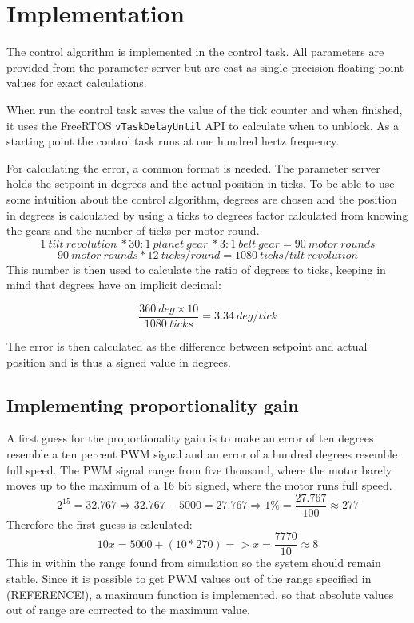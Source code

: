 \section{Implementation}
The control algorithm is implemented in the control task. All parameters are provided from the parameter server but are cast as single precision floating point values for exact calculations.

When run the control task saves the value of the tick counter and when finished, it uses the FreeRTOS \texttt{vTaskDelayUntil} API to calculate when to unblock. As a starting point the control task runs at one hundred hertz frequency.

For calculating the error, a common format is needed. The parameter server holds the setpoint in degrees and the actual position in ticks. To be able to use some intuition about the control algorithm, degrees are chosen and the position in degrees is calculated by using a ticks to degrees factor calculated from knowing the gears and the number of ticks per motor round.
\begin{equation}
1 \ tilt \ revolution \ * 30:1 \ planet \ gear \ * 3:1 \ belt \ gear = 90 \ motor \ rounds
\end{equation}
\begin{equation}
 90 \ motor \ rounds * 12 \ ticks/round = 1080 \ ticks/tilt \ revolution
\end{equation}
This number is then used to calculate the ratio of degrees to ticks, keeping in mind that degrees have an implicit decimal:

\begin{equation}
\frac{360 \ deg \times 10}{1080 \ ticks} = 3.34\ deg/tick 
\end{equation}

The error is then calculated as the difference between setpoint and actual position and is thus a signed value in degrees.

\subsection{Implementing proportionality gain}
A first guess for the proportionality gain is to make an error of ten degrees resemble a ten percent PWM signal and an error of a hundred degrees resemble full speed. The PWM signal range from five thousand, where the motor barely moves up to the maximum of a 16 bit signed, where the motor runs full speed.
\begin{equation}
2^{15} = 32.767 \Rightarrow 
32.767 - 5000 = 27.767 \Rightarrow 
1 \% = \frac{27.767}{100} \approx  277
	\label{eq:PWM}
\end{equation}
 Therefore the first guess is calculated:
\begin{equation}
10x = 5000 + (10 * 270) => x = \frac{7770}{10} \approx  8
	\label{eq:P-term}
\end{equation}
This in within the range found from simulation so the system should remain stable. Since it is possible to get PWM values out of the range specified in (REFERENCE!), a maximum function is implemented, so that absolute values out of range are corrected to the maximum value.

